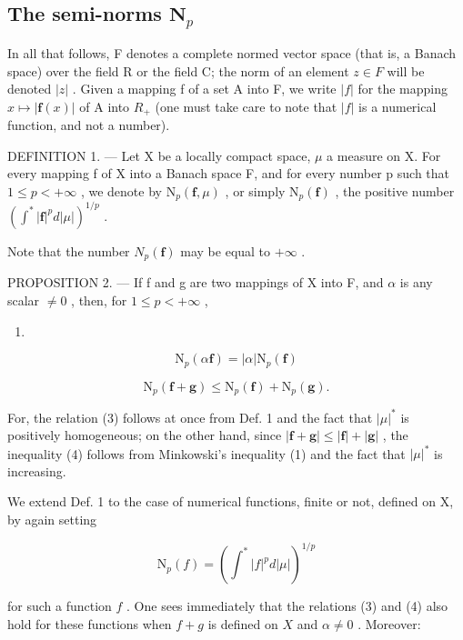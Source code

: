 \subsection{\texorpdfstring{The semi-norms \(\mathbf{N}_p\)}{The semi-norms N sub p}}

In all that follows, F denotes a complete normed vector space (that is, a Banach space) over the field R or the field C; the norm of an element \(z \in F\) will be denoted \(|z|\) . Given a mapping f of a set A into F, we write \(|f|\) for the mapping \(x \mapsto |\mathbf{f}(x)|\) of A into \(R_{+}\) (one must take care to note that \(|f|\) is a numerical function, and not a number).

DEFINITION 1. --- Let X be a locally compact space, \(\mu\) a measure on X. For every mapping f of X into a Banach space F, and for every number p such that \(1 \leqslant p < +\infty\) , we denote by \(\mathrm{N}_p(\mathbf{f}, \mu)\) , or simply \(\mathrm{N}_p(\mathbf{f})\) , the positive number \((\int^* |\mathbf{f}|^p d|\mu|)^{1/p}\) .

Note that the number \(N_{p}(\mathbf{f})\) may be equal to \(+\infty\) .

PROPOSITION 2. --- If f and g are two mappings of X into F, and \(\alpha\) is any scalar \(\neq 0\) , then, for \(1 \leqslant p < +\infty\) ,

\begin{enumerate}
\def\labelenumi{(\arabic{enumi})}
\setcounter{enumi}{2}
\tightlist
\item
\end{enumerate}

\[
\mathrm{N} _ {p} (\alpha \mathbf {f}) = | \alpha | \mathrm{N} _ {p} (\mathbf {f})\tag{4}
\]

\[
\mathrm{N} _ {p} (\mathbf {f} + \mathbf {g}) \leqslant \mathrm{N} _ {p} (\mathbf {f}) + \mathrm{N} _ {p} (\mathbf {g}).
\]

For, the relation (3) follows at once from Def. 1 and the fact that \(|\mu|^*\) is positively homogeneous; on the other hand, since \(|\mathbf{f} + \mathbf{g}| \leqslant |\mathbf{f}| + |\mathbf{g}|\) , the inequality (4) follows from Minkowski's inequality (1) and the fact that \(|\mu|^*\) is increasing.

We extend Def. 1 to the case of numerical functions, finite or not, defined on X, by again setting

\[
\mathrm{N} _ {p} (f) = \left(\int^ {*} | f | ^ {p} d | \mu |\right) ^ {1 / p}
\]

for such a function \(f\) . One sees immediately that the relations (3) and (4) also hold for these functions when \(f + g\) is defined on \(X\) and \(\alpha \neq 0\) . Moreover:

